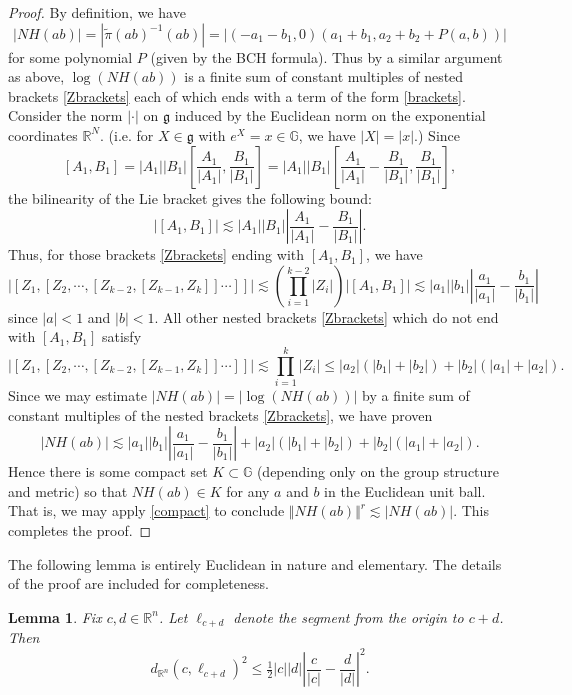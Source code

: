 \documentclass[11pt]{amsart}
\newtheorem{lemma}[theorem]{Lemma}
\theoremstyle{definition}
\numberwithin{theorem}{section} \numberwithin{equation}{section}
\begin{document}
\begin{proof}
By definition, we have
$$
|NH(ab)| = |\tilde{\pi}(ab)^{-1} (ab)| = | (-a_1-b_1,0) (a_1 + b_1, a_2 + b_2 + P(a,b)) |
$$
for some polynomial $P$ (given by the BCH formula).
Thus by a similar argument as above, 
$\log (NH(ab))$ is a finite sum of constant multiples of nested brackets \eqref{Zbrackets}
each of which ends with a term of the form \eqref{brackets}.
Consider the norm $| \cdot|$ on $\mathfrak{g}$ 
induced by the Euclidean norm on the exponential coordinates $\mathbb{R}^N$.
(i.e. for $X \in \mathfrak{g}$ with $e^X = x \in \mathbb{G}$, we have $|X| = |x|$.)
Since 
$$
[A_1,B_1] = |A_1||B_1| \left[ \frac{A_1}{|A_1|},\frac{B_1}{|B_1|} \right]
= |A_1||B_1| \left[ \frac{A_1}{|A_1|} - \frac{B_1}{|B_1|},\frac{B_1}{|B_1|} \right],
$$
the bilinearity of the Lie bracket gives the following bound:
$$
|[A_1,B_1]| \lesssim |A_1||B_1|\left| \frac{A_1}{|A_1|} - \frac{B_1}{|B_1|} \right|.
$$
Thus, for those brackets \eqref{Zbrackets} ending with $[A_1,B_1]$, we have
$$
|[Z_1,[Z_2,\cdots,[Z_{k-2},[Z_{k-1},Z_k]]\cdots]]| 
\lesssim \left( \prod_{i=1}^{k-2} |Z_i| \right) \left|[A_1,B_1]\right|
\lesssim |a_1||b_1|\left| \frac{a_1}{|a_1|} - \frac{b_1}{|b_1|} \right|
$$
since $|a| < 1$ and $|b| < 1$.
All other nested brackets \eqref{Zbrackets} which do not end with $[A_1,B_1]$ satisfy
$$
|[Z_1,[Z_2,\cdots,[Z_{k-2},[Z_{k-1},Z_k]]\cdots]]|
\lesssim \prod_{i=1}^k |Z_i| 
\leq |a_2|(|b_1|+|b_2|) + |b_2|(|a_1| + |a_2|).
$$
Since we may estimate $|NH(ab)| = |\log(NH(ab))|$ by a finite sum of constant multiples of the nested brackets \eqref{Zbrackets},
we have proven
$$
|NH(ab)| \lesssim |a_1||b_1|\left| \frac{a_1}{|a_1|} - \frac{b_1}{|b_1|} \right| + |a_2|(|b_1|+|b_2|) + |b_2|(|a_1| + |a_2|) .
$$
Hence there is some compact set $K \subset \mathbb{G}$
(depending only on the group structure and metric)
so that $NH(ab) \in K$ for any $a$ and $b$ in the Euclidean unit ball.
That is, we may apply \eqref{compact} to conclude
$\Vert NH(ab) \Vert^r \lesssim |NH(ab)|$.
This completes the proof.
\end{proof}

The following lemma is entirely Euclidean in nature and elementary.
The details of the proof are included for completeness.

\begin{lemma}
\label{height}
Fix $c,d \in \mathbb{R}^n$.
Let $\ell_{c+d}$ denote the segment from the origin to $c+d$.
Then
$$
d_{\mathbb{R}^n}(c,\ell_{c+d})^2 \leq \tfrac12 |c||d| \left| \frac{c}{|c|} - \frac{d}{|d|} \right|^2.
$$
\end{lemma}
\end{document}
